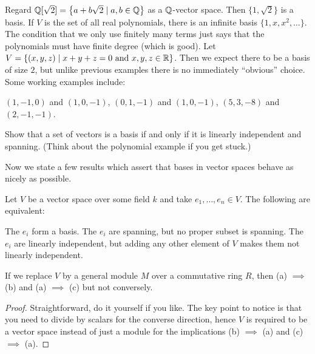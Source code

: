 \begin{example}
	\listhack
	\begin{enumerate}[(a)]
		\ii Regard $\mathbb Q[\sqrt2]
		= \left\{ a + b \sqrt 2 \mid a, b \in \mathbb Q \right\}$
		as a $\mathbb Q$-vector space.
		Then $\{1, \sqrt 2\}$ is a basis.
		\ii If $V$ is the set of all real polynomials,
		there is an infinite basis $\{1, x, x^2, \dots\}$.
		The condition that we only use finitely many terms just says
		that the polynomials must have finite degree (which is good).
		\ii Let $V = \{ (x,y,z) \mid x+y+z=0 \text{ and } x,y,z \in \mathbb R\}$.
		Then we expect there to be a basis of size $2$, but unlike previous examples
		there is no immediately ``obvious'' choice.
		Some working examples include:
		\begin{itemize}
			\ii $(1,-1,0)$ and $(1,0,-1)$,
			\ii $(0,1,-1)$ and $(1,0,-1)$,
			\ii $(5,3,-8)$ and $(2,-1,-1)$.
		\end{itemize}
	\end{enumerate}
\end{example}

\begin{exercise}
	Show that a set of vectors is a basis if and only if
	it is linearly independent and spanning.
	(Think about the polynomial example if you get stuck.)
\end{exercise}

Now we state a few results which assert
that bases in vector spaces behave as nicely as possible.
\begin{theorem}
	\label{thm:vector_best}
	Let $V$ be a vector space over some field $k$
	and take $e_1, \dots, e_n \in V$. The following are equivalent:
	\begin{enumerate}[(a)]
		\ii The $e_i$ form a basis.
		\ii The $e_i$ are spanning, but no proper subset is spanning.
		\ii The $e_i$ are linearly independent, but adding any other
		element of $V$ makes them not linearly independent.
	\end{enumerate}
\end{theorem}
\begin{remark}
	If we replace $V$ by a general module $M$ over a commutative ring $R$,
	then (a) $\implies$ (b) and (a) $\implies$ (c) but not conversely.
\end{remark}
\begin{proof}
	Straightforward, do it yourself if you like.
	The key point to notice is that you need to divide by scalars for the converse direction,
	hence $V$ is required to be a vector space instead of just a module
	for the implications (b) $\implies$ (a) and (c) $\implies$ (a).
\end{proof}

